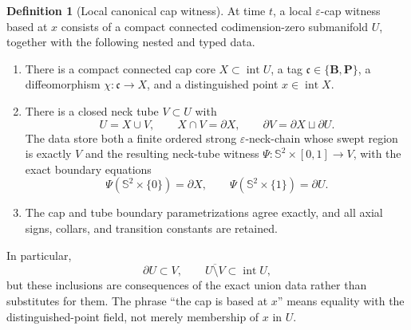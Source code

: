\documentclass[10pt]{coll-l}
\newcommand{\Sph}{\mathbb{S}}
\theoremstyle{definition}
\newtheorem{definition}[theorem]{Definition}
\theoremstyle{remark}
\numberwithin{section}{chapter}
\numberwithin{equation}{chapter}
\begin{document}
\begin{definition}[Local canonical cap witness]
\label{def:ncs-local-canonical-cap}
At time $t$, a local $\varepsilon$-cap witness based at $x$ consists of a
compact connected codimension-zero submanifold $U$, together with the
following nested and typed data.
\begin{enumerate}
\item There is a compact connected cap core
      $X\subset\operatorname{int}U$, a tag
      $\mathfrak c\in\{\mathbf B,\mathbf P\}$, a diffeomorphism
      $\chi:\mathfrak c\to X$, and a distinguished point
      $x\in\operatorname{int}X$.
\item There is a closed neck tube $V\subset U$ with
      \begin{equation}
       U=X\cup V,\qquad
       X\cap V=\partial X,\qquad
       \partial V=\partial X\sqcup\partial U.          \label{eq:ncs-local-cap-exact-union}
      \end{equation}
      The data store both a finite ordered strong
      $\varepsilon$-neck-chain whose swept region is exactly $V$ and the
      resulting neck-tube witness
      $\Psi:\Sph^2\times[0,1]\to V$, with the exact boundary equations
      \begin{equation}
       \Psi(\Sph^2\times\{0\})=\partial X,
       \qquad
       \Psi(\Sph^2\times\{1\})=\partial U.            \label{eq:ncs-local-cap-tube-boundaries}
      \end{equation}
\item The cap and tube boundary parametrizations agree exactly, and all
      axial signs, collars, and transition constants are retained.
\end{enumerate}
In particular,
\begin{equation}
 \partial U\subset V,\qquad
 \overline{U\setminus V}\subset\operatorname{int}U,   \label{eq:ncs-local-cap-collar-position}
\end{equation}
but these inclusions are consequences of the exact union data rather than
substitutes for them.  The phrase ``the cap is based at $x$'' means equality
with the distinguished-point field, not merely membership of $x$ in $U$.
\end{definition}
\end{document}
